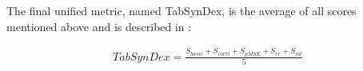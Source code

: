   \item[Similarity Score:]
  The final unified metric, named TabSynDex, is the average of all scores mentioned above and is described in  \cite{chundawat2022UniversalMetricRobust}:

  \begin{equation}
    \begin{align*}
      \label{eqn:tabsyndex}
      TabSynDex = \frac{S_{basic}+S_{corrl}+S_{pMSE}+S_{cr}+S_{ml}}{5}
      \end{align*}
  \end{equation}


